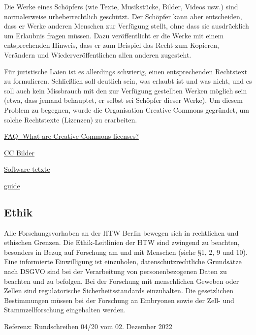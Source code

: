 Die Werke eines Schöpfers (wie Texte, Musikstücke, Bilder, Videos usw.) sind normalerweise urheberrechtlich geschützt. Der Schöpfer kann aber entscheiden, dass er Werke anderen Menschen zur Verfügung stellt, ohne dass sie ausdrücklich um Erlaubnis fragen müssen. Dazu veröffentlicht er die Werke mit einem entsprechenden Hinweis, dass er zum Beispiel das Recht zum Kopieren, Verändern und Wiederveröffentlichen allen anderen zugesteht.

Für juristische Laien ist es allerdings schwierig, einen entsprechenden Rechtstext zu formulieren. Schließlich soll deutlich sein, was erlaubt ist und was nicht, und es soll auch kein Missbrauch mit den zur Verfügung gestellten Werken möglich sein (etwa, dass jemand behauptet, er selbst sei Schöpfer dieser Werke). Um diesem Problem zu begegnen, wurde die Organisation Creative Commons gegründet, um solche Rechtstexte (Lizenzen) zu erarbeiten. \cite{wikicc}



\hyperlink{https://www.wur.nl/en/article/What-are-Creative-Commons-licenses.htm}{FAQ- What are Creative Commons licenses?}

\hyperlink{https://creativecommons.org/licenses/}{CC Bilder }

\hyperlink{https://moqod-software.medium.com/understanding-open-source-and-free-software-licensing-c0fa600106c9}{Software tetxte}

\hyperlink{https://choosealicense.com/}{guide}
\subsection{Ethik}

Alle Forschungsvorhaben an der HTW Berlin bewegen sich in rechtlichen und ethischen Grenzen. Die Ethik-Leitlinien der HTW sind zwingend zu beachten, besonders in Bezug auf Forschung am und mit Menschen (siehe §1, 2, 9 und 10). Eine informierte Einwilligung ist einzuholen, datenschutzrechtliche Grundsätze nach DSGVO sind bei der Verarbeitung von personenbezogenen Daten zu beachten und zu befolgen. Bei der Forschung mit menschlichen Geweben oder Zellen sind regulatorische Sicherheitsstandards einzuhalten. Die gesetzlichen Bestimmungen müssen bei der Forschung an Embryonen sowie der Zell- und Stammzellforschung eingehalten werden. 

Referenz: Rundschreiben 04/20 vom 02. Dezember 2022
